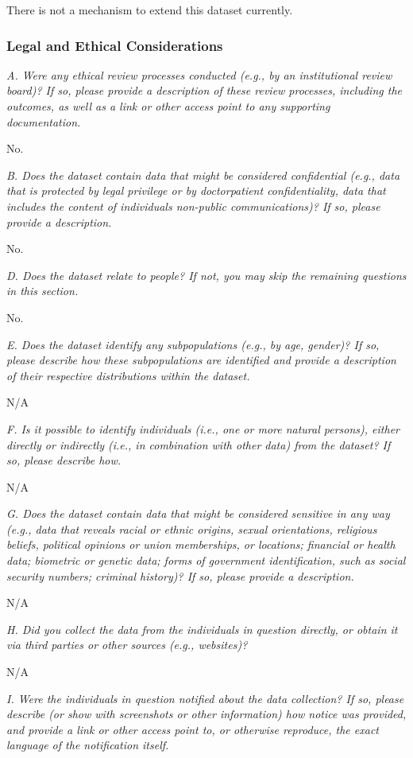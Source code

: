 \documentclass{article}
\begin{document}
There is not a mechanism to extend this dataset currently.

\subsubsection{Legal and Ethical Considerations}

\textit{A. Were any ethical review processes conducted (e.g., by an institutional review board)? If so, please provide a description of these review processes, including the outcomes, as well as a link or other access point to any supporting documentation.}

No.

\textit{B. Does the dataset contain data that might be considered confidential (e.g., data that is protected by legal privilege or by doctorpatient confidentiality, data that includes the content of individuals non-public communications)? If so, please provide a description.}

No.

\textit{D. Does the dataset relate to people? If not, you may skip the remaining questions in this section.}

No.

\textit{E. Does the dataset identify any subpopulations (e.g., by age, gender)? If so, please describe how these subpopulations are identified and provide a description of their respective distributions within the dataset.}

N/A

\textit{F. Is it possible to identify individuals (i.e., one or more natural persons), either directly or indirectly (i.e., in combination with other data) from the dataset? If so, please describe how.}

N/A

\textit{G. Does the dataset contain data that might be considered sensitive in any way (e.g., data that reveals racial or ethnic origins, sexual orientations, religious beliefs, political opinions or union memberships, or locations; financial or health data; biometric or genetic data; forms of government identification, such as social security numbers; criminal history)? If so, please provide a description.
}

N/A

\textit{H. Did you collect the data from the individuals in question directly, or obtain it via third parties or other sources (e.g., websites)?}

N/A

\textit{I. Were the individuals in question notified about the data collection? If so, please describe (or show with screenshots or other information) how notice was provided, and provide a link or other access point to, or otherwise reproduce, the exact language of the notification itself.}
\end{document}
